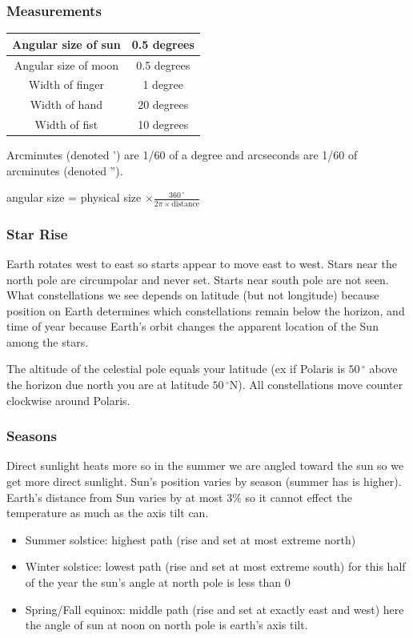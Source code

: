 \documentclass[12pt]{article}
\begin{document}
\subsubsection{Measurements}
\begin{center}
\begin{tabular}{|c|c|}
    \hline
    Angular size of sun & 0.5 degrees\\
    \hline
    Angular size of moon & 0.5 degrees\\
    \hline
    Width of finger &1 degree\\
    \hline
    Width of hand & 20 degrees \\
    \hline
    Width of fist & 10 degrees\\
    \hline
\end{tabular}
\end{center}
Arcminutes (denoted ') are 1/60 of a degree and arcseconds are 1/60 of arcminutes (denoted '').
\begin{center}
    angular size = physical size $\times \frac{360\,^{\circ}}{2\pi \times \text{distance}}$
\end{center}

\subsubsection{Star Rise}
Earth rotates west to east so starts appear to move east to west. Stars near the north pole are circumpolar and never set. Starts near south pole are not seen.
What constellations we see depends on latitude (but not longitude) because position on Earth determines which constellations remain below the horizon, and time of year because Earth's orbit changes the apparent location of the Sun among the stars.

The altitude of the celestial pole equals your latitude (ex if Polaris is $50\,^{\circ}$ above the horizon due north you are at latitude $50\,^{\circ}$N). All constellations move counter clockwise around Polaris.

\subsubsection{Seasons}
Direct sunlight heats more so in the summer we are angled toward the sun so we get more direct sunlight. Sun's position varies by season (summer has is higher). Earth's distance from Sun varies by at most 3\% so it cannot effect the temperature as much as the axis tilt can.
\begin{itemize}
\item Summer solstice: highest path (rise and set at most extreme north)
\item Winter solstice: lowest path (rise and set at most extreme south) for this half of the year the sun's angle at north pole is less than 0
\item Spring/Fall equinox: middle path (rise and set at exactly east and west) here the angle of sun at noon on north pole is earth's axis tilt.
\end{itemize}
\end{document}
